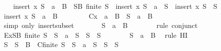 \begin{isabellebody}
\ \ \isamarkupfalse%
\ {\isachardoublequoteopen}insert\ x\ S\ {\isasymsubseteq}\ {\isacharbraceleft}a{\isacharbraceright}\ {\isasymunion}\ B\ {\isasymLongrightarrow}\ {\isasymexists}S{\isacharprime}{\isacharprime}{\isasymsubseteq}B{\isachardot}\ finite\ S{\isacharprime}{\isacharprime}\ {\isasymand}\ {\isacharparenleft}insert\ x\ S\ {\isacharequal}\ {\isacharbraceleft}a{\isacharbraceright}\ {\isasymunion}\ S{\isacharprime}{\isacharprime}\ {\isasymor}\ insert\ x\ S\ {\isacharequal}\ S{\isacharprime}{\isacharprime}{\isacharparenright}{\isachardoublequoteclose}\isanewline
\ \ \isamarkupfalse%
\ {\isacharminus}\isanewline
\ \ \ \ \isamarkupfalse%
\ {\isachardoublequoteopen}insert\ x\ S\ {\isasymsubseteq}\ {\isacharbraceleft}a{\isacharbraceright}\ {\isasymunion}\ B{\isachardoublequoteclose}\ \isanewline
\ \ \ \ \isamarkupfalse%
\ \isamarkupfalse%
\ C{\isacharcolon}{\isachardoublequoteopen}x\ {\isasymin}\ {\isacharbraceleft}a{\isacharbraceright}\ {\isasymunion}\ B\ {\isasymand}\ S\ {\isasymsubseteq}\ {\isacharbraceleft}a{\isacharbraceright}\ {\isasymunion}\ B{\isachardoublequoteclose}\isanewline
\ \ \ \ \ \ \isamarkupfalse%
\ {\isacharparenleft}simp\ only{\isacharcolon}\ insert{\isacharunderscore}subset{\isacharparenright}\isanewline
\ \ \ \ \isamarkupfalse%
\ \isamarkupfalse%
\ {\isachardoublequoteopen}S\ {\isasymsubseteq}\ {\isacharbraceleft}a{\isacharbraceright}\ {\isasymunion}\ B{\isachardoublequoteclose}\isanewline
\ \ \ \ \ \ \isamarkupfalse%
\ {\isacharparenleft}rule\ conjunct{}{\isacharparenright}\isanewline
\ \ \ \ \isamarkupfalse%
\ Ex{}{\isacharcolon}{\isachardoublequoteopen}{\isasymexists}S{\isacharprime}{\isasymsubseteq}B{\isachardot}\ finite\ S{\isacharprime}\ {\isasymand}\ {\isacharparenleft}S\ {\isacharequal}\ {\isacharbraceleft}a{\isacharbraceright}\ {\isasymunion}\ S{\isacharprime}\ {\isasymor}\ S\ {\isacharequal}\ S{\isacharprime}{\isacharparenright}{\isachardoublequoteclose}\isanewline
\ \ \ \ \ \ \isamarkupfalse%
\ {\isacartoucheopen}S\ {\isasymsubseteq}\ {\isacharbraceleft}a{\isacharbraceright}\ {\isasymunion}\ B{\isacartoucheclose}\ \isamarkupfalse%
\ {\isacharparenleft}rule\ HI{\isacharparenright}\isanewline
\ \ \ \ \isamarkupfalse%
\ S{\isacharprime}\ \ {\isachardoublequoteopen}S{\isacharprime}\ {\isasymsubseteq}\ B{\isachardoublequoteclose}\ \ C{}{\isacharcolon}{\isachardoublequoteopen}finite\ S{\isacharprime}\ {\isasymand}\ {\isacharparenleft}S\ {\isacharequal}\ {\isacharbraceleft}a{\isacharbraceright}\ {\isasymunion}\ S{\isacharprime}\ {\isasymor}\ S\ {\isacharequal}\ S{\isacharprime}{\isacharparenright}{\isachardoublequoteclose}\isanewline

\end{isabellebody}
